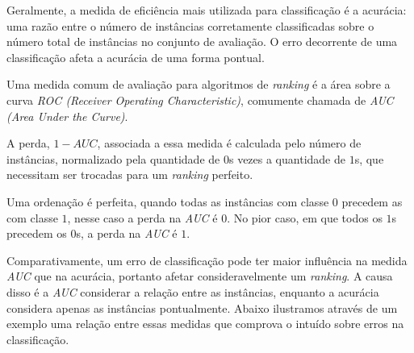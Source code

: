 Geralmente, a medida de eficiência mais utilizada para classificação é a
acurácia: uma razão entre o número de instâncias corretamente classificadas
sobre o número total de instâncias no conjunto de avaliação. O erro decorrente
de uma classificação afeta a acurácia de uma forma pontual.

Uma medida comum de avaliação para algoritmos de \emph{ranking} é a área sobre a
curva \emph{ROC (Receiver Operating Characteristic)}, comumente chamada de
\emph{AUC (Area Under the Curve)}.

A perda, $1 - AUC$, associada a essa medida é calculada pelo número de instâncias, normalizado pela quantidade de $0$s vezes a quantidade de $1$s, que necessitam ser trocadas para um \emph{ranking} perfeito.

Uma ordenação é perfeita, quando todas as instâncias com classe $0$ precedem as com classe $1$, nesse caso a perda na \emph{AUC} é $0$. No pior caso, em que todos os $1$s precedem os $0$s, a perda na \emph{AUC} é $1$.

Comparativamente, um erro de classificação pode ter maior influência na medida \emph{AUC} que na acurácia, portanto afetar consideravelmente um \emph{ranking}. A causa disso é a \emph{AUC} considerar a relação entre as instâncias, enquanto a acurácia considera apenas as instâncias pontualmente. Abaixo ilustramos através de um exemplo uma relação entre essas medidas que comprova o intuído sobre erros na classificação.

